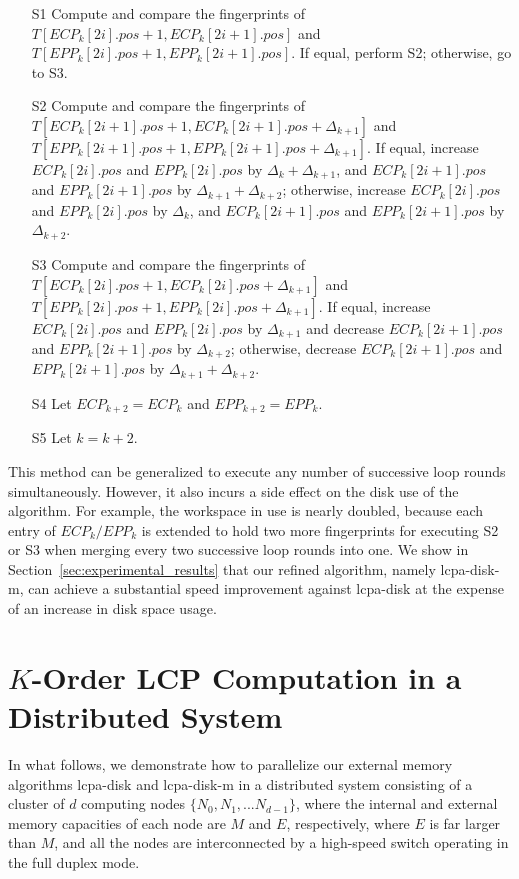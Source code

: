 \documentclass[10pt,journal,compsoc]{IEEEtran}
\begin{document}
\begin{CJK*}{GBK}{song}
\begin{enumerate}
\item[S1] Compute and compare the fingerprints of $T[ECP_k[2i].pos+1,ECP_k[2i+1].pos]$ and $T[EPP_k[2i].pos+1,EPP_k[2i+1].pos]$. If equal, perform S2; otherwise, go to S3.
\item[S2] Compute and compare the fingerprints of $T[ECP_k[2i+1].pos+1,ECP_k[2i+1].pos+\Delta_{k+1}]$ and $T[EPP_k[2i+1].pos+1,EPP_k[2i+1].pos+\Delta_{k+1}]$. If equal, increase $ECP_k[2i].pos$ and $EPP_k[2i].pos$ by $\Delta_{k}+\Delta_{k+1}$, and $ECP_k[2i+1].pos$ and $EPP_k[2i+1].pos$ by $\Delta_{k+1}+\Delta_{k+2}$; otherwise, increase $ECP_k[2i].pos$ and $EPP_k[2i].pos$ by $\Delta_{k}$, and $ECP_k[2i+1].pos$ and $EPP_k[2i+1].pos$ by $\Delta_{k+2}$.
\item[S3] Compute and compare the fingerprints of $T[ECP_k[2i].pos+1,ECP_k[2i].pos+\Delta_{k+1}]$ and $T[EPP_k[2i].pos+1,EPP_k[2i].pos+\Delta_{k+1}]$. If equal, increase $ECP_k[2i].pos$ and $EPP_k[2i].pos$ by $\Delta_{k+1}$ and decrease $ECP_k[2i+1].pos$ and $EPP_k[2i+1].pos$ by $\Delta_{k+2}$; otherwise, decrease $ECP_k[2i+1].pos$ and $EPP_k[2i+1].pos$ by $\Delta_{k+1}+\Delta_{k+2}$.
\item[S4] Let $ECP_{k+2}=ECP_{k}$ and $EPP_{k+2}=EPP_{k}$.
\item[S5] Let $k = k+2$.
\end{enumerate}

This method can be generalized to execute any number of successive loop rounds simultaneously. However, it also incurs a side effect on the disk use of the algorithm. For example, the workspace in use is nearly doubled, because each entry of $ECP_k/EPP_k$ is extended to hold two more fingerprints for executing S2 or S3 when merging every two successive loop rounds into one. We show in Section~\ref{sec:experimental_results} that our refined algorithm, namely lcpa-disk-m, can achieve a substantial speed improvement against lcpa-disk at the expense of an increase in disk space usage.

\section{$K$-Order LCP Computation in a Distributed System}\label{sec:construction_in_distributed}
In what follows, we demonstrate how to parallelize our external memory algorithms lcpa-disk and lcpa-disk-m in a distributed system consisting of a cluster of $d$ computing nodes $\{N_0, N_1, ...N_{d-1}\}$, where the internal and external memory capacities of each node are $M$ and $E$, respectively, where $E$ is far larger than $M$, and all the nodes are interconnected by a high-speed switch operating in the full duplex mode.

\end{CJK*}
\end{document}
